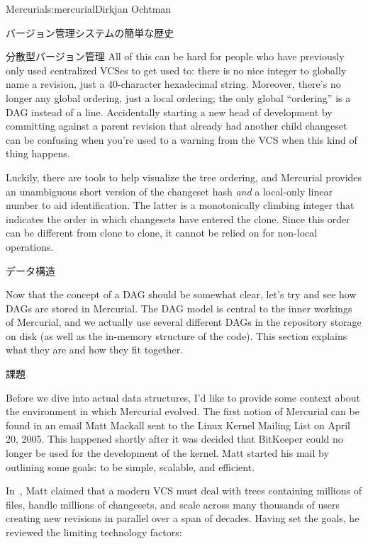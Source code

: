\begin{aosachapter}{Mercurial}{s:mercurial}{Dirkjan Ochtman}
\begin{aosasect1}{バージョン管理システムの簡単な歴史}
\begin{aosasect2}{分散型バージョン管理}
All of this can be hard for people who have previously only used
centralized VCSes to get used to: there is no nice integer to globally
name a revision, just a 40-character hexadecimal string. Moreover,
there's no longer any global ordering, just a local ordering; the only
global ``ordering'' is a DAG instead of a line. Accidentally starting
a new head of development by committing against a parent revision that
already had another child changeset can be confusing when you're used
to a warning from the VCS when this kind of thing happens.

Luckily, there are tools to help visualize the tree ordering, and
Mercurial provides an unambiguous short version of the changeset hash
\emph{and} a local-only linear number to aid identification. The
latter is a monotonically climbing integer that indicates the order in
which changesets have entered the clone. Since this order can be
different from clone to clone, it cannot be relied on for non-local
operations.

\end{aosasect2}

\end{aosasect1}

\begin{aosasect1}{データ構造}

Now that the concept of a DAG should be somewhat clear, let's try
and see how DAGs are stored in Mercurial. The DAG model is central to
the inner workings of Mercurial, and we actually use several different
DAGs in the repository storage on disk (as well as the in-memory
structure of the code). This section explains what they are and how
they fit together.

\begin{aosasect2}{課題}

Before we dive into actual data structures, I'd like to provide some
context about the environment in which Mercurial evolved. The first
notion of Mercurial can be found in an email Matt Mackall sent to the
Linux Kernel Mailing List on April 20, 2005. This happened shortly
after it was decided that BitKeeper could no longer be used for the
development of the kernel. Matt started his mail by outlining some
goals: to be simple, scalable, and efficient.

In~\cite{bib:mackall:better}, Matt claimed that a modern VCS must deal
with trees containing millions of files, handle millions of
changesets, and scale across many thousands of users creating new
revisions in parallel over a span of decades. Having set the goals,
he reviewed the limiting technology factors:


\end{aosasect2}
\end{aosasect1}
\end{aosachapter}

